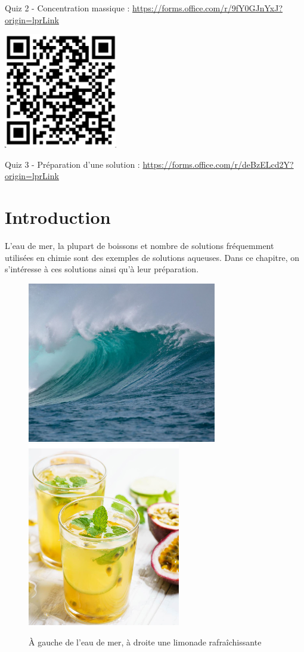 \documentclass[french, a4paper, 12pt, twocolumn, landscape]{article}
\begin{document}
\begin{center}
\begin{minipage}{.12\textwidth}
		Quiz 2 - Concentration massique : \url{https://forms.office.com/r/9fY0GJnYxJ?origin=lprLink}
	\end{minipage}\hspace{.5cm}
\begin{minipage}{.12\textwidth}
			\centering
			\includegraphics[width=.5\textwidth]{Quiz3.png}
	
			Quiz 3 - Préparation d'une solution : \url{https://forms.office.com/r/deBzELcd2Y?origin=lprLink}
		\end{minipage}
\end{center}


\section*{Introduction}

L'eau de mer, la plupart de boissons et nombre de solutions fréquemment utilisées en chimie sont des exemples de solutions aqueuses. Dans ce chapitre, on s'intéresse à ces solutions ainsi qu'à leur préparation. 

\begin{figure}[ht]
	\centering
	\includegraphics[width=.2\textwidth]{EauDeMer.png}\hspace{1cm}
	\includegraphics[width=.15\textwidth]{limonade.png}
	\caption{À gauche de l'eau de mer, à droite une limonade rafraîchissante}
\end{figure}
\end{document}
